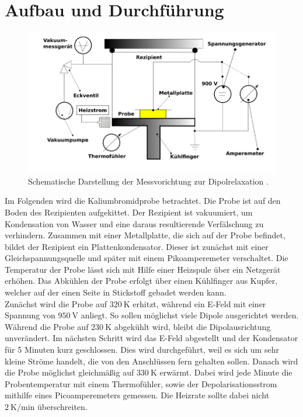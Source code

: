 \section{Aufbau und Durchführung}
\label{sec:Durchführung}

\begin{figure}
    \centering
    \includegraphics[scale=0.3]{content/Aufbau.png}
    \caption{Schematische Darstellung der Messvorichtung zur Dipolrelaxation \cite{Anleitung}.}
    \label{fig:Aufbau}
  \end{figure}

Im Folgenden wird die Kaliumbromidprobe betrachtet. Die Probe ist auf den Boden des Rezipienten aufgekittet. Der Rezipient ist vakuumiert, um 
Kondensation von Wasser und eine daraus resultierende Verfälschung zu verhindern. Zusammen mit einer Metallplatte, die sich auf der Probe 
befindet, bildet der Rezipient ein Plattenkondensator. Dieser ist zunächst mit einer Gleichspannungsquelle und später mit einem Pikoamperemeter 
verschaltet. Die Temperatur der Probe lässt sich mit Hilfe einer Heizspule über ein Netzgerät erhöhen. Das Abkühlen der Probe erfolgt über 
einen Kühlfinger aus Kupfer, welcher auf der einen Seite in Stickstoff gebadet werden kann. \\
Zunächst wird die Probe auf $\SI{320}{\kelvin}$ erhitzt, während ein E-Feld mit einer Spannung von $\SI{950}{\volt}$ anliegt. So sollen möglichst 
viele Dipole ausgerichtet werden. Während die Probe auf $\SI{230}{\kelvin}$ abgekühlt wird, bleibt die Dipolausrichtung unverändert. Im nächsten 
Schritt wird das E-Feld abgestellt und der Kondensator für 5 Minuten kurz geschlossen. Dies wird durchgeführt, weil es sich um sehr kleine Ströme
handelt, die von den Anschlüssen fern gehalten sollen. Danach wird die Probe möglichst gleichmäßig auf $\SI{330}{\kelvin}$ erwärmt. Dabei 
wird jede Minute die Probentemperatur mit einem Thermofühler, sowie der Depolarisationsstrom mithilfe eines Picoamperemeters gemessen. Die Heizrate
sollte dabei nicht $\SI{2}{\kelvin\per\minute}$ überschreiten.  